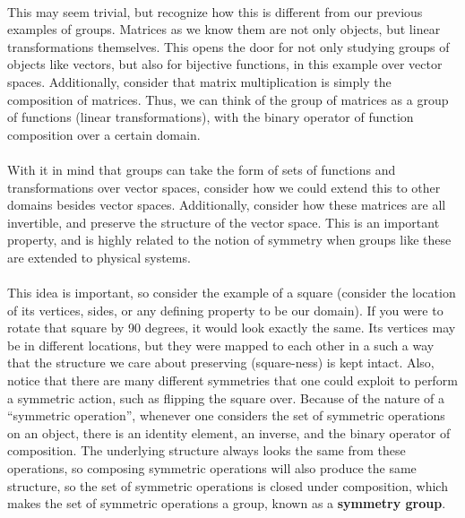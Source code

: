\documentclass[twoside]{article}
\begin{document}
\paragraph*{} This may seem trivial, but recognize how this is different from our 
previous examples of groups. Matrices as we know them are not only objects, 
but linear transformations themselves. This opens the door for not only studying 
groups of objects like vectors, but also for bijective functions, in this example 
over vector spaces. Additionally, consider that matrix multiplication is simply 
the composition of matrices. Thus, we can think of the group of matrices as a
group of functions (linear transformations), with the binary operator of 
function composition over a certain domain. 

\paragraph*{} With it in mind that groups can take the form of sets of functions 
and transformations over vector spaces, consider how we could extend this to 
other domains besides vector spaces. Additionally, consider how these matrices 
are all invertible, and preserve the structure of the vector space. This is an 
important property, and is highly related to the notion of symmetry when 
groups like these are extended to physical systems. 

\paragraph*{} This idea is important, so consider the example of
a square (consider the location of its vertices, sides, or any defining property
to be our domain). If you were to rotate that square by 90 degrees, it would look exactly the 
same. Its vertices may be in different locations, but they were mapped to each other 
in a such a way that the structure we care about preserving (square-ness) is kept 
intact. Also, notice that there are many different symmetries that one could exploit 
to perform a symmetric action, such as flipping the square over. Because of the 
nature of a “symmetric operation”, 
whenever one considers the set of symmetric operations on an object, there is an 
identity element, an inverse, and the binary operator of composition. The underlying structure always looks 
the same from these operations, so composing symmetric operations will also produce the same structure, 
so the set of symmetric operations is closed under composition, which makes 
the set of symmetric operations a group, known as a \textbf{symmetry group}.
\end{document}
